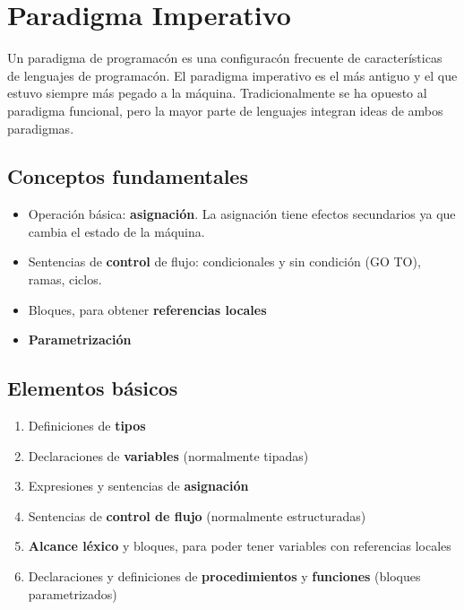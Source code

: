 \documentclass[10pt,a4paper]{report}
\begin{document}
    \section{Paradigma Imperativo}

        \par Un paradigma de programacón es una configuracón frecuente de características de lenguajes de programacón. El 
            paradigma imperativo es el más antiguo y el que estuvo siempre más pegado a la máquina. Tradicionalmente se ha 
            opuesto al paradigma funcional, pero la mayor parte de lenguajes integran ideas de ambos paradigmas.

        \subsection{Conceptos fundamentales}

            \begin{itemize}
                \item Operación básica: \textbf{asignación}. La asignación tiene efectos secundarios ya que cambia el 
                    estado de la máquina.
                \item Sentencias de \textbf{control} de flujo: condicionales y sin condición (GO TO), ramas, ciclos.
                \item Bloques, para obtener \textbf{referencias locales}
                \item \textbf{Parametrización}
            \end{itemize}

        \subsection{Elementos básicos}
            
            \begin{enumerate}
                \item Definiciones de \textbf{tipos}
                \item Declaraciones de \textbf{variables} (normalmente tipadas)     
                \item Expresiones y sentencias de \textbf{asignación}
                \item Sentencias de \textbf{control de flujo} (normalmente estructuradas)
                \item \textbf{Alcance léxico} y bloques, para poder tener variables con referencias locales
                \item Declaraciones y definiciones de \textbf{procedimientos} y 
                \textbf{funciones} (bloques parametrizados)
            \end{enumerate}
                
\end{document}
